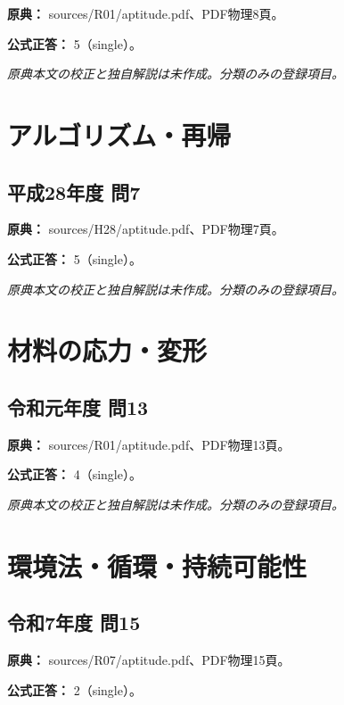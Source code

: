 \noindent\textbf{原典：} sources/R01/aptitude.pdf、PDF物理8頁。

\textbf{公式正答：} 5（single）。

\par\textit{原典本文の校正と独自解説は未作成。分類のみの登録項目。}

\section{アルゴリズム・再帰}

\subsection{平成28年度 問7}
\label{q:h28-reg-apt-07}

\noindent\textbf{原典：} sources/H28/aptitude.pdf、PDF物理7頁。

\textbf{公式正答：} 5（single）。

\par\textit{原典本文の校正と独自解説は未作成。分類のみの登録項目。}

\section{材料の応力・変形}

\subsection{令和元年度 問13}
\label{q:r01-reg-apt-13}

\noindent\textbf{原典：} sources/R01/aptitude.pdf、PDF物理13頁。

\textbf{公式正答：} 4（single）。

\par\textit{原典本文の校正と独自解説は未作成。分類のみの登録項目。}

\section{環境法・循環・持続可能性}

\subsection{令和7年度 問15}
\label{q:r07-reg-apt-15}

\noindent\textbf{原典：} sources/R07/aptitude.pdf、PDF物理15頁。

\textbf{公式正答：} 2（single）。

